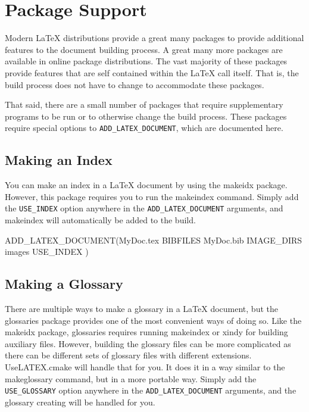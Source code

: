 \documentclass{article}
\newcommand*{\textfile}[1]{\textsf{#1}}
\newcommand*{\textprog}[1]{\textfile{#1}}
\newcommand*{\textlatexpackage}[1]{\textsf{#1}}
\newcommand*{\textcmake}[1]{\texttt{#1}}
\newcommand*{\UseLATEX}{\textfile{UseLATEX.cmake}\xspace}
\newcommand*{\latex}{\LaTeX\xspace}
\newcommand*{\ald}{\textcmake{ADD\_LATEX\_DOCUMENT}\xspace}
\begin{document}

  \section{Package Support}
  \label{sec:PackageSupport}

  Modern \latex distributions provide a great many packages to provide
  additional features to the document building process.  A great many more
  packages are available in online package distributions.  The vast
  majority of these packages provide features that are self contained
  within the \latex call itself.  That is, the build process does not have
  to change to accommodate these packages.

  That said, there are a small number of packages that require
  supplementary programs to be run or to otherwise change the build
  process.  These packages require special options to \ald, which are
  documented here.

  \subsection{Making an Index}
  \label{sec:MakingAnIndex}

  You can make an index in a \latex document by using the
  \textlatexpackage{makeidx} package. However, this package requires you to
  run the \textprog{makeindex} command. Simply add the
  \textcmake{USE\_INDEX} option anywhere in the \ald arguments, and
  \textprog{makeindex} will automatically be added to the build.

  \begin{CodeListing}
ADD_LATEX_DOCUMENT(MyDoc.tex
  BIBFILES MyDoc.bib
  IMAGE_DIRS images
  USE_INDEX
  )
  \end{CodeListing}

  \subsection{Making a Glossary}
  \label{sec:MakingAGlossary}

  There are multiple ways to make a glossary in a \latex document, but the
  \textlatexpackage{glossaries} package provides one of the most convenient
  ways of doing so.  Like the \textlatexpackage{makeidx} package,
  \textlatexpackage{glossaries} requires running \textprog{makeindex} or
  \textprog{xindy} for building auxiliary files.  However, building the
  glossary files can be more complicated as there can be different sets of
  glossary files with different extensions.  \UseLATEX will handle that for
  you.  It does it in a way similar to the \textprog{makeglossary} command,
  but in a more portable way.  Simply add the \textcmake{USE\_GLOSSARY}
  option anywhere in the \ald arguments, and the glossary creating will be
  handled for you.
\end{document}
